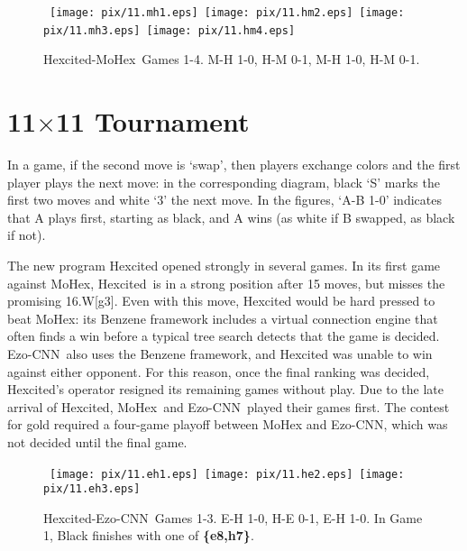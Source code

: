 \documentclass{IOS-Book-Article}
\def\Ec{\mbox{\sc Ezo-CNN}}
\def\Hite{\mbox{\sc Hexcited}}
\def\Mx{\mbox{\sc MoHex}}
\begin{document}
\begin{figure}
\hspace*{-2cm}\
\texttt{[image: pix/11.mh1.eps]}\hspace*{-1.5cm}\
\texttt{[image: pix/11.hm2.eps]}\hspace*{-1.5cm}\
\texttt{[image: pix/11.mh3.eps]}\hspace*{-1.5cm}\
\texttt{[image: pix/11.hm4.eps]}
\caption{\Hite-\Mx\ Games 1-4. M-H 1-0, H-M 0-1, M-H 1-0, H-M 0-1.}
\end{figure}

\section{11$\times$11 Tournament}
In a game, if the second move is `swap', then players
exchange colors and the first player plays the next move:
in the corresponding diagram, black `S' marks the first two moves
and white `3' the next move.
In the figures, `A-B 1-0' indicates that A plays first, starting as black, 
and A wins (as white if B swapped, as black if not).

The new program \Hite{} opened strongly in several games.
In its first game against \Mx, \Hite\ is in a strong
position after 15 moves, but misses the promising 16.W[g3].
Even with this move, \Hite{} would be hard pressed to beat
\Mx: its Benzene framework includes a virtual connection engine
that often finds a win before 
a typical tree search detects that the game is decided.
\Ec\ also uses the Benzene framework,
and \Hite{} was unable to win against either opponent.
For this reason, once the final ranking was decided,
\Hite's operator resigned its remaining games without play.
Due to the late arrival of \Hite{},
\Mx\ and \Ec\ played their games first.
The contest for gold required a four-game playoff between \Mx{} and \Ec{},
which was not decided until the final game.

\begin{figure}
\hspace*{-2cm}\
\texttt{[image: pix/11.eh1.eps]}\hspace*{-1.5cm}\
\texttt{[image: pix/11.he2.eps]}\hspace*{-1.5cm}\
\texttt{[image: pix/11.eh3.eps]}
\caption{\Hite-\Ec\ Games 1-3. E-H 1-0, H-E 0-1, E-H 1-0.
In Game 1, Black finishes with one of {\bf \{e8,h7\}}.}
\end{figure}
\end{document}
